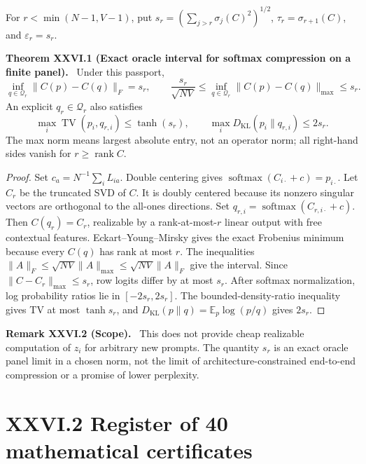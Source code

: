 \documentclass[11pt,a4paper,oneside]{book}
\DeclareMathOperator{\rank}{rank}\DeclareMathOperator{\Tr}{Tr}
\newcommand{\statement}[3]{\par\medskip\noindent\textbf{#1 #2 (#3).}\ }
\begin{document}
For $r<\min(N-1,V-1)$, put $s_r=(\sum_{j>r}\sigma_j(C)^2)^{1/2}$, $\tau_r=\sigma_{r+1}(C)$, and $\varepsilon_r=s_r$.
\statement{Theorem}{XXVI.1}{Exact oracle interval for softmax compression on a finite panel} Under this passport,
\begin{equation}\inf_{q\in\mathcal Q_r}\|C(p)-C(q)\|_F=s_r,\qquad\frac{s_r}{\sqrt{NV}}\le\inf_{q\in\mathcal Q_r}\|C(p)-C(q)\|_{\max}\le s_r.\tag{105}\end{equation}
An explicit $q_r\in\mathcal Q_r$ also satisfies
\begin{equation}\max_i\operatorname{TV}(p_i,q_{r,i})\le\tanh(s_r),\qquad\max_iD_{\mathrm{KL}}(p_i\|q_{r,i})\le2s_r.\tag{106}\end{equation}
The max norm means largest absolute entry, not an operator norm; all right-hand sides vanish for $r\ge\rank C$.
\begin{proof}Set $c_a=N^{-1}\sum_iL_{ia}$. Double centering gives $\operatorname{softmax}(C_{i\cdot}+c)=p_{i\cdot}$. Let $C_r$ be the truncated SVD of $C$. It is doubly centered because its nonzero singular vectors are orthogonal to the all-ones directions. Set $q_{r,i}=\operatorname{softmax}(C_{r,i\cdot}+c)$. Then $C(q_r)=C_r$, realizable by a rank-at-most-$r$ linear output with free contextual features. Eckart--Young--Mirsky gives the exact Frobenius minimum because every $C(q)$ has rank at most $r$. The inequalities $\|A\|_F\le\sqrt{NV}\|A\|_{\max}\le\sqrt{NV}\|A\|_F$ give the interval. Since $\|C-C_r\|_{\max}\le s_r$, row logits differ by at most $s_r$. After softmax normalization, log probability ratios lie in $[-2s_r,2s_r]$. The bounded-density-ratio inequality gives TV at most $\tanh s_r$, and $D_{\mathrm{KL}}(p\|q)=\mathbb E_p\log(p/q)$ gives $2s_r$.\end{proof}
\statement{Remark}{XXVI.2}{Scope} This does not provide cheap realizable computation of $z_i$ for arbitrary new prompts. The quantity $s_r$ is an exact oracle panel limit in a chosen norm, not the limit of architecture-constrained end-to-end compression or a promise of lower perplexity.
\section*{XXVI.2 Register of 40 mathematical certificates}
\end{document}
